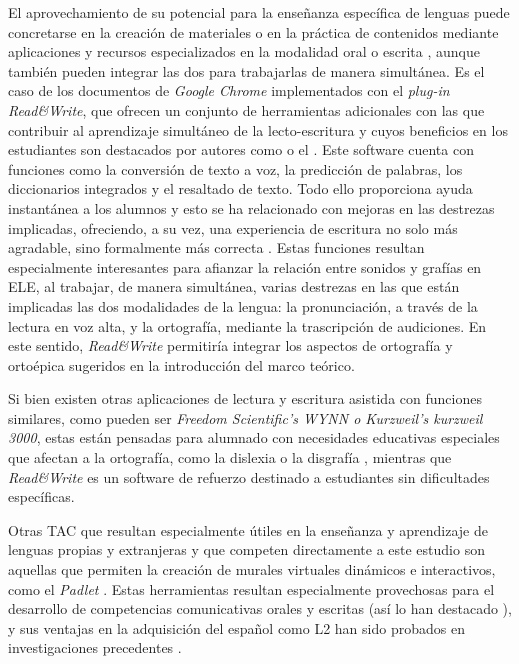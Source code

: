 \documentclass[spanish]{textolivre}
\begin{document}
El aprovechamiento de su potencial para la enseñanza específica de lenguas puede concretarse en la creación de materiales o en la práctica de contenidos mediante aplicaciones y recursos especializados en la modalidad oral o escrita \cite{vazquez-cano_nuevas_2014,estevez_rionegro_tecnologias_2024}, aunque también pueden integrar las dos para trabajarlas de manera simultánea. Es el caso de los documentos de \textit{Google Chrome} implementados con el \textit{plug-in Read\&Write}, que ofrecen un conjunto de herramientas adicionales con las que contribuir al aprendizaje simultáneo de la lecto-escritura y cuyos beneficios en los estudiantes son destacados por autores como \textcite{liou_training_2009,pim_emerging_2013} o el \textcite{departamento_de_educacion_de_la_comunidad_autonoma_del_pais_vasco_propuestas_2020}. Este software cuenta con funciones como la conversión de texto a voz, la predicción de palabras, los diccionarios integrados y el resaltado de texto. Todo ello proporciona ayuda instantánea a los alumnos y esto se ha relacionado con mejoras en las destrezas implicadas, ofreciendo, a su vez, una experiencia de escritura no solo más agradable, sino formalmente más correcta \cite{orr_assisted_2007,ok_digital_2019}. Estas funciones resultan especialmente interesantes para afianzar la relación entre sonidos y grafías en ELE, al trabajar, de manera simultánea, varias destrezas en las que están implicadas las dos modalidades de la lengua: la pronunciación, a través de la lectura en voz alta, y la ortografía, mediante la trascripción de audiciones. En este sentido, \textit{Read\&Write} permitiría integrar los aspectos de ortografía y ortoépica sugeridos en la introducción del marco teórico.

Si bien existen otras aplicaciones de lectura y escritura asistida con funciones similares, como pueden ser \textit{Freedom Scientific’s WYNN o Kurzweil’s kurzweil 3000}, estas están pensadas para alumnado con necesidades educativas especiales que afectan a la ortografía, como la dislexia o la disgrafía \cite{orr_assisted_2007}, mientras que \textit{Read\&Write} es un software de refuerzo destinado a estudiantes sin dificultades específicas.

Otras TAC que resultan especialmente útiles en la enseñanza y aprendizaje de lenguas propias y extranjeras y que competen directamente a este estudio son aquellas que permiten la creación de murales virtuales dinámicos e interactivos, como el \textit{Padlet} \cite{servio_padlet:_2022,conceicao_as_2022}. Estas herramientas resultan especialmente provechosas para el desarrollo de competencias comunicativas orales y escritas (así lo han destacado \textcite{vazquez-cano_nuevas_2014,estevez_rionegro_tecnologias_2024}), y sus ventajas en la adquisición del español como L2 han sido probados en investigaciones precedentes \cite{stinga_fortaleciendo_2021,gonzalez_enfoque_2023}.
\end{document}
